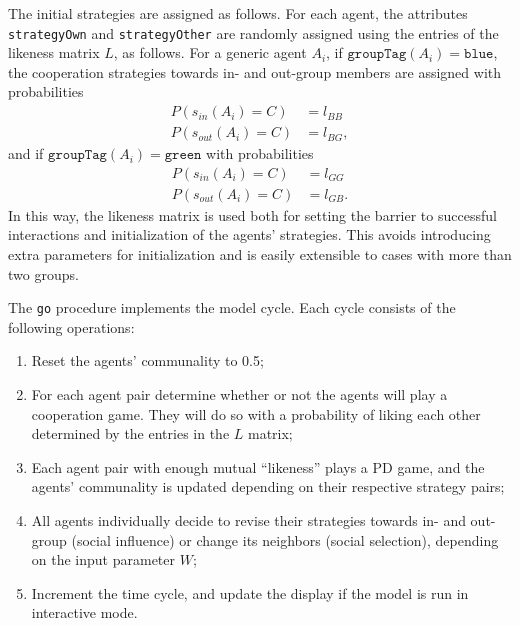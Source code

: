 The initial strategies are assigned as follows. For each agent, the attributes \texttt{strategyOwn} and \texttt{strategyOther} are randomly assigned using the entries of the likeness matrix $ L $, as follows. For a generic agent $ A_i $, if $ \texttt{groupTag} (A_i) = \texttt{blue} $, the cooperation strategies towards in- and out-group members are assigned with probabilities
\begin{align}
\label{eq:10}
P(s_{in} (A_i) = C) & = l_{BB}  \\
P(s_{out} (A_i) = C) & =l_{BG}, 
\end{align}
and if $ \texttt{groupTag} (A_i) = \texttt{green} $ with probabilities
\begin{align}
\label{eq:11}
P(s_{in} (A_i) = C) & = l_{GG}  \\
P(s_{out} (A_i) = C) & = l_{GB}. 
\end{align}
In this way, the likeness matrix is used both for setting the barrier to successful interactions and initialization of the agents' strategies. This avoids introducing extra parameters for initialization and is easily extensible to cases with more than two groups.

The \texttt{go} procedure implements the model cycle. Each cycle consists of the following operations:
\begin{enumerate}
	\item Reset the agents' communality to 0.5;
	\item For each agent pair determine whether or not the agents will play a cooperation game. They will do so with a probability of liking  each other determined by the entries in the $ L $ matrix;
	\item Each agent pair with enough mutual ``likeness'' plays a PD game, and the agents' communality is updated depending on their respective strategy pairs;
	\item All agents individually decide to revise their strategies towards in- and out-group (social influence) or change its neighbors (social selection), depending on the input parameter $ W $;
	\item Increment the time cycle, and update the display if the model is run in interactive mode.
\end{enumerate}

